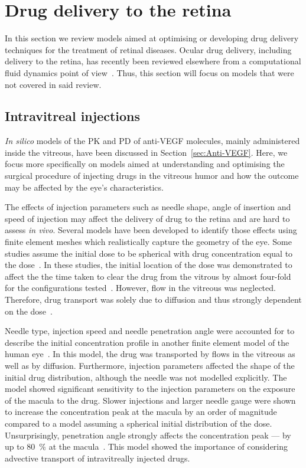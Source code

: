 \documentclass{article}
\begin{document}
\section{Drug delivery to the retina}\label{sec:DrugDelivery}

In this section we review models aimed at optimising or developing drug delivery techniques for the treatment of retinal diseases.
Ocular drug delivery, including delivery to the retina, has recently been reviewed elsewhere from a computational fluid dynamics point of view~\cite{Bhandari_2021}.
Thus, this section will focus on models that were not covered in said review.

\subsection{Intravitreal injections}

\textit{In silico} models of the PK and PD of anti-VEGF molecules, mainly administered inside the vitreous, have been discussed in Section~\ref{sec:Anti-VEGF}.
Here, we focus more specifically on models aimed at understanding and optimising the surgical procedure of injecting drugs in the vitreous humor and how the outcome may be affected by the eye's characteristics.

The effects of injection parameters such as needle shape, angle of insertion and speed of injection may affect the delivery of drug to the retina and are hard to assess \textit{in vivo}.
Several models have been developed to identify those effects using finite element meshes which realistically capture the geometry of the eye.
Some studies assume the initial dose to be spherical with drug concentration equal to the dose~\cite{Friedrich_1997,Friedrich_1997a}.
In these studies, the initial location of the dose was demonstrated to affect the the time taken to clear the drug from the vitrous by almost four-fold for the configurations tested~\cite{Friedrich_1997}.
However, flow in the vitreous was neglected.
Therefore, drug transport was solely due to diffusion and thus strongly dependent on the dose~\cite{Friedrich_1997}.

Needle type, injection speed and needle penetration angle were accounted for to describe the initial concentration profile in another finite element model of the human eye~\cite{Jooybar_2014}.
In this model, the drug was transported by flows in the vitreous as well as by diffusion.
Furthermore, injection parameters affected the shape of the initial drug distribution, although the needle was not modelled explicitly.
The model showed significant sensitivity to the injection parameters on the exposure of the macula to the drug.
Slower injections and larger needle gauge were shown to increase the concentration peak at the macula by an order of magnitude compared to a model assuming a spherical initial distribution of the dose.
Unsurprisingly, penetration angle strongly affects the concentration peak --- by up to \SI{80}{\percent} at the macula~\cite{Jooybar_2014}.
This model showed the importance of considering advective transport of intravitreally injected drugs. 
\end{document}
